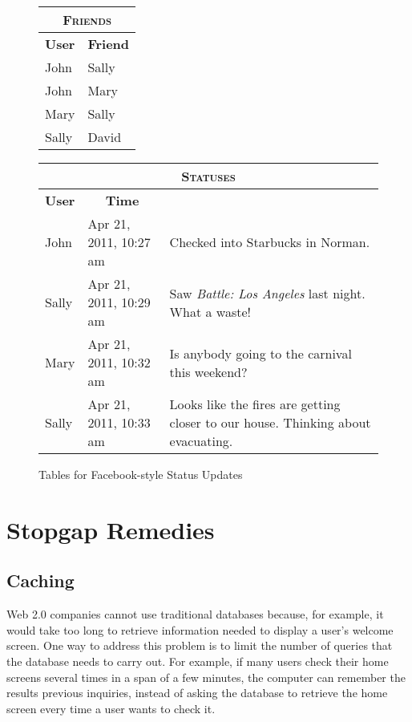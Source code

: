\begin{figure}
	\begin{center}
		\begin{tabular}[t]{ll}
			\hline
			\multicolumn{2}{c}{\textsc{Friends}} \\
			\hline
			\multicolumn{1}{c}{\textbf{User}} & \multicolumn{1}{c}{\textbf{Friend}} \\
			\hline
			John  & Sally \\
			John  & Mary \\
			Mary  & Sally \\
			Sally & David \\
			\hline
		\end{tabular}
		\hspace{.5in}
		\begin{tabular}[t]{ll>{\raggedright}p{1in}}
			\hline
			\multicolumn{3}{c}{\textsc{Statuses}} \\
			\hline
			\multicolumn{1}{c}{\textbf{User}} & \multicolumn{1}{c}{\textbf{Time}} & \multicolumn{1}{c}{\textbf{Status}} \\
			\hline
			John  & Apr 21, 2011, 10:27 am & Checked into Starbucks in Norman. \tabularnewline
			Sally & Apr 21, 2011, 10:29 am & Saw \emph{Battle: Los Angeles} last night.  What a waste! \tabularnewline
			Mary  & Apr 21, 2011, 10:32 am & Is anybody going to the carnival this weekend? \tabularnewline
			Sally & Apr 21, 2011, 10:33 am & Looks like the fires are getting closer to our house.  Thinking about evacuating. \tabularnewline
			\hline
		\end{tabular}
	\end{center}
	\caption{Tables for Facebook-style Status Updates}
	\label{facebook-tables}
\end{figure}

\section{Stopgap Remedies}

\subsection{Caching}

Web 2.0 companies cannot use traditional databases
because, for example, it would take too long to retrieve information needed
to display a user's welcome screen.
One way to address this problem is to limit the number of queries that the
database needs to carry out.
For example, if many users check their home screens
several times in a span of a few minutes,
the computer can remember the results previous inquiries,
instead of asking the database to
retrieve the home screen every time a user wants to check it.

